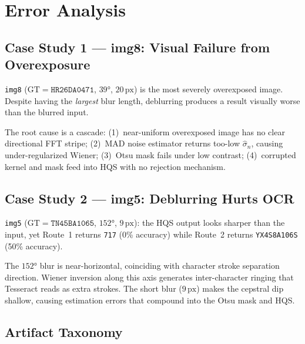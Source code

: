 \documentclass[12pt,a4paper]{article}
\begin{document}
\section{Error Analysis}

\subsection{Case Study 1 --- img8: Visual Failure from Overexposure}

\texttt{img8} ($\mathrm{GT}{=}\mathtt{HR26DA0471}$, $39°$, $20\,\mathrm{px}$) is the
most severely overexposed image. Despite having the \emph{largest} blur length,
deblurring produces a result visually worse than the blurred input.

The root cause is a cascade: (1)~near-uniform overexposed image has no clear directional
FFT stripe; (2)~MAD noise estimator returns too-low $\hat{\sigma}_n$, causing under-regularized
Wiener; (3)~Otsu mask fails under low contrast; (4)~corrupted kernel and mask feed into
HQS with no rejection mechanism.

\subsection{Case Study 2 --- img5: Deblurring Hurts OCR}

\texttt{img5} ($\mathrm{GT}{=}\mathtt{TN45BA1065}$, $152°$, $9\,\mathrm{px}$):
the HQS output looks sharper than the input, yet Route~1 returns \texttt{717} (0\%
accuracy) while Route~2 returns \texttt{YX4S8A106S} (50\% accuracy).

The $152°$ blur is near-horizontal, coinciding with character stroke separation direction.
Wiener inversion along this axis generates inter-character ringing that Tesseract reads
as extra strokes. The short blur ($9\,\mathrm{px}$) makes the cepstral dip shallow,
causing estimation errors that compound into the Otsu mask and HQS.

\subsection{Artifact Taxonomy}
\end{document}
